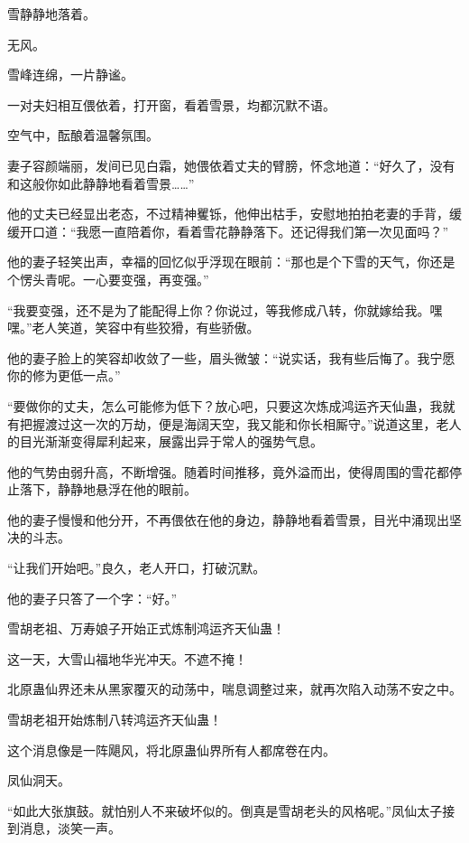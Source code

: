 
\begin{this_body}

雪静静地落着。

无风。

雪峰连绵，一片静谧。

一对夫妇相互偎依着，打开窗，看着雪景，均都沉默不语。

空气中，酝酿着温馨氛围。

妻子容颜端丽，发间已见白霜，她偎依着丈夫的臂膀，怀念地道：“好久了，没有和这般你如此静静地看着雪景……”

他的丈夫已经显出老态，不过精神矍铄，他伸出枯手，安慰地拍拍老妻的手背，缓缓开口道：“我愿一直陪着你，看着雪花静静落下。还记得我们第一次见面吗？”

他的妻子轻笑出声，幸福的回忆似乎浮现在眼前：“那也是个下雪的天气，你还是个愣头青呢。一心要变强，再变强。”

“我要变强，还不是为了能配得上你？你说过，等我修成八转，你就嫁给我。嘿嘿。”老人笑道，笑容中有些狡猾，有些骄傲。

他的妻子脸上的笑容却收敛了一些，眉头微皱：“说实话，我有些后悔了。我宁愿你的修为更低一点。”

“要做你的丈夫，怎么可能修为低下？放心吧，只要这次炼成鸿运齐天仙蛊，我就有把握渡过这一次的万劫，便是海阔天空，我又能和你长相厮守。”说道这里，老人的目光渐渐变得犀利起来，展露出异于常人的强势气息。

他的气势由弱升高，不断增强。随着时间推移，竟外溢而出，使得周围的雪花都停止落下，静静地悬浮在他的眼前。

他的妻子慢慢和他分开，不再偎依在他的身边，静静地看着雪景，目光中涌现出坚决的斗志。

“让我们开始吧。”良久，老人开口，打破沉默。

他的妻子只答了一个字：“好。”

雪胡老祖、万寿娘子开始正式炼制鸿运齐天仙蛊！

这一天，大雪山福地华光冲天。不遮不掩！

北原蛊仙界还未从黑家覆灭的动荡中，喘息调整过来，就再次陷入动荡不安之中。

雪胡老祖开始炼制八转鸿运齐天仙蛊！

这个消息像是一阵飓风，将北原蛊仙界所有人都席卷在内。

凤仙洞天。

“如此大张旗鼓。就怕别人不来破坏似的。倒真是雪胡老头的风格呢。”凤仙太子接到消息，淡笑一声。


\end{this_body}
